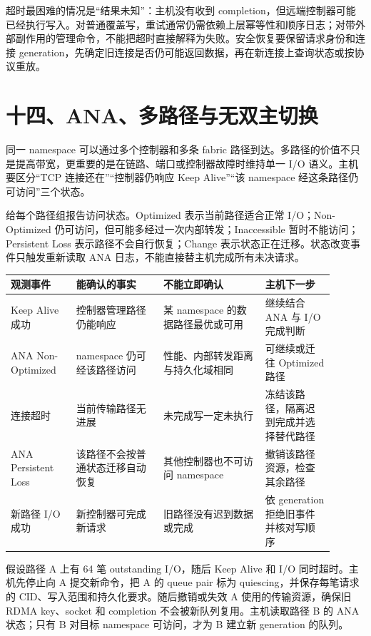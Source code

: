 超时最困难的情况是“结果未知”：主机没有收到 completion，但远端控制器可能已经执行写入。对普通覆盖写，重试通常仍需依赖上层幂等性和顺序日志；对带外部副作用的管理命令，不能把超时直接解释为失败。安全恢复要保留请求身份和连接 generation，先确定旧连接是否仍可能返回数据，再在新连接上查询状态或按协议重放。

\section{十四、ANA、多路径与无双主切换}

同一 namespace 可以通过多个控制器和多条 fabric 路径到达。多路径的价值不只是提高带宽，更重要的是在链路、端口或控制器故障时维持单一 I/O 语义。主机要区分“TCP 连接还在”“控制器仍响应 Keep Alive”“该 namespace 经这条路径仍可访问”三个状态。

给每个路径组报告访问状态。Optimized 表示当前路径适合正常 I/O；Non-Optimized 仍可访问，但可能多经过一次内部转发；Inaccessible 暂时不能访问；Persistent Loss 表示路径不会自行恢复；Change 表示状态正在迁移。状态改变事件只触发重新读取 ANA 日志，不能直接替主机完成所有未决请求。

\begin{longtable}{L{0.18\linewidth}L{0.24\linewidth}L{0.29\linewidth}L{0.19\linewidth}}
\toprule
观测事件 & 能确认的事实 & 不能立即确认 & 主机下一步 \\
\midrule
Keep Alive 成功 & 控制器管理路径仍能响应 & 某 namespace 的数据路径最优或可用 & 继续结合 ANA 与 I/O 完成判断 \\\tablerowrule
ANA Non-Optimized & namespace 仍可经该路径访问 & 性能、内部转发距离与持久化域相同 & 可继续或迁往 Optimized 路径 \\\tablerowrule
连接超时 & 当前传输路径无进展 & 未完成写一定未执行 & 冻结该路径，隔离迟到完成并选择替代路径 \\\tablerowrule
ANA Persistent Loss & 该路径不会按普通状态迁移自动恢复 & 其他控制器也不可访问 namespace & 撤销该路径资源，检查其余路径 \\\tablerowrule
新路径 I/O 成功 & 新控制器可完成新请求 & 旧路径没有迟到数据或完成 & 依 generation 拒绝旧事件并核对写顺序 \\
\bottomrule
\end{longtable}


假设路径 A 上有 64 笔 outstanding I/O，随后 Keep Alive 和 I/O 同时超时。主机先停止向 A 提交新命令，把 A 的 queue pair 标为 quiescing，并保存每笔请求的 CID、写入范围和持久化要求。随后撤销或失效 A 使用的传输资源，确保旧 RDMA key、socket 和 completion 不会被新队列复用。主机读取路径 B 的 ANA 状态；只有 B 对目标 namespace 可访问，才为 B 建立新 generation 的队列。

